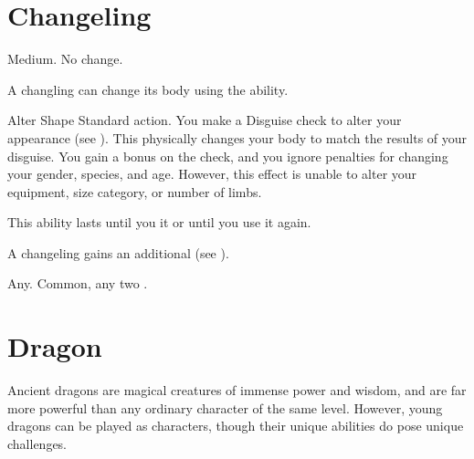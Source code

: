 \section{Changeling}

   Medium.
   No change.
  \begin{raggeditemize}
     A changling can change its body using the  ability.
      \begin{activeability}{Alter Shape}
        \abilityusagetime Standard action.
        \rankline
        You make a Disguise check to alter your appearance (see ).
        This physically changes your body to match the results of your disguise.
        You gain a  bonus on the check, and you ignore penalties for changing your gender, species, and age.
        However, this effect is unable to alter your equipment, size category, or number of limbs.

        This ability lasts until you  it or until you use it again.
      \end{activeability}
     A changeling gains an additional  (see ).
  \end{raggeditemize}
   Any.
   Common, any two .

\section{Dragon}
  Ancient dragons are magical creatures of immense power and wisdom, and are far more powerful than any ordinary character of the same level.
  However, young dragons can be played as characters, though their unique abilities do pose unique challenges.

